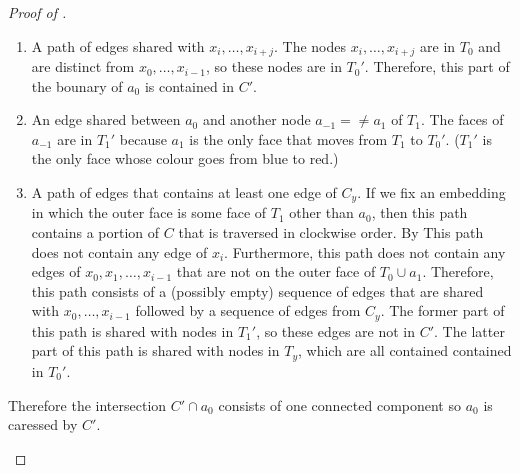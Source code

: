 \documentclass[a4paper,UKenglish]{socg-lipics-v2019}
\begin{document}
\begin{proof}[Proof of ]
\begin{enumerate}
\begin{enumerate}
     \item A path of edges shared with $x_i,\ldots,x_{i+j}$.
      The nodes $x_i,\ldots,x_{i+j}$ are in $T_0$ and are distinct from
      $x_0,\ldots,x_{i-1}$, so these nodes are in $T_0'$.
      Therefore, this part of the bounary of $a_0$ is contained in $C'$.

     \item An edge shared between $a_0$ and another node $a_{-1}=\neq
     a_1$ of $T_1$. The faces of $a_{-1}$ are in $T_1'$ because $a_1$
     is the only face that moves from $T_1$ to $T_0'$. ($T_1'$ is the
     only face whose colour goes from blue to red.)

     \item A path of edges that contains at least one edge of $C_y$. If
     we fix an embedding in which the outer face is some face of $T_1$
     other than $a_0$, then this path contains a portion of $C$ that
     is traversed in clockwise order. By 
     This path does not contain any edge of $x_i$.  Furthermore, this
     path does not contain any edges of $x_0,x_1,\ldots,x_{i-1}$ that
     are not on the outer face of $T_0\cup a_1$.  Therefore, this path
     consists of a (possibly empty) sequence of edges that are shared with
     $x_0,\ldots,x_{i-1}$ followed by a sequence of edges from $C_y$. The
     former part of this path is shared with nodes in $T_1'$, so these
     edges are not in $C'$.  The latter part of this path is shared with
     nodes in $T_y$, which are all contained contained in $T_0'$.
  \end{enumerate} 
  Therefore the intersection $C'\cap a_0$ consists of one connected
  component so $a_0$ is caressed by $C'$. \qedhere
\end{enumerate}
%  
%

\end{proof}
\end{document}
